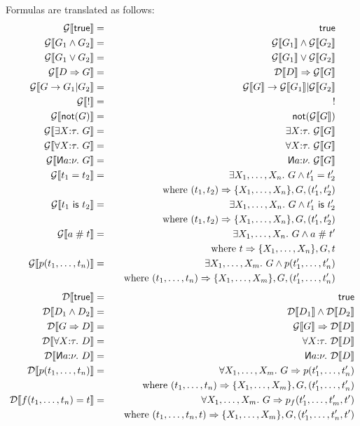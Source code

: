 \documentclass[draft,12pt]{report}
\newcommand{\fresh}{\mathrel\#}
\newcommand{\new}{\reflectbox{\sf N}}
\newcommand{\andd}{\wedge}
\newcommand{\orr}{\vee}
\newcommand{\impp}{\Rightarrow}
\begin{document}
Formulas are translated as follows:
\begin{eqnarray*}
  \gflat{\mathsf{true}} &=& \mathsf{true}\\
  \gflat{G_1 \andd G_2} &=& \gflat{G_1} \andd \gflat{G_2}\\
  \gflat{G_1 \orr G_2} &=& \gflat{G_1} \orr \gflat{G_2}\\
  \gflat{D \impp G} &=& \dflat{D} \impp \gflat{G}\\
\gflat{G \to G_1 | G_2} &=& \gflat{G} \to \gflat{G_1} | \gflat{G_2}\\
\gflat{!} &=& !\\
\gflat{\mathsf{not}(G)} &=& \mathsf{not}(\gflat{G})\\
  \gflat{\exists X{:}\tau.~G} &=& \exists X{:}\tau.~\gflat{G}\\
  \gflat{\forall X{:}\tau.~G} &=& \forall X{:}\tau.~\gflat{G}\\
  \gflat{\new a{:}\nu.~G} &=& \new a{:}\nu.~\gflat{G}\\
  \gflat{t_1 = t_2} &=& \exists X_1,\ldots,X_n.~G \andd t_1' = t_2'\\
&&  \quad \text{where }\tflat{(t_1,t_2)}{\{X_1,\ldots,X_n\}}{G}{(t_1',t_2')}\\
  \gflat{t_1 ~\mathsf{is}~ t_2} &=& \exists X_1,\ldots,X_n.~G \andd t_1' ~\mathsf{is}~ t_2'\\
&&  \quad \text{where }\tflat{(t_1,t_2)}{\{X_1,\ldots,X_n\}}{G}{(t_1',t_2')}\\
  \gflat{a \fresh t} &=& \exists X_1,\ldots,X_n.~G \andd a \fresh t'\\
&&  \quad \text{where }\tflat{t}{\{X_1,\ldots,X_n\}}{G}{t}\\
\gflat{p(t_1,\ldots,t_n)} &=& \exists{X_1,\ldots,X_m}.~G \andd
p(t_1',\ldots,t_n') \\
&&\quad\text{where }
\tflat{(t_1,\ldots,t_n)}{\{X_1,\ldots,X_m\}}{G}{(t_1',\ldots,t_n')}
\end{eqnarray*}
\begin{eqnarray*}
\dflat{\mathsf{true}} &=& \mathsf{true}\\
\dflat{D_1\andd D_2} &=& \dflat{D_1}\andd\dflat{D_2}\\
\dflat{G\impp D} &=& \gflat{G} \impp \dflat{D}\\
\dflat{\forall X{:}\tau.~D} &=& \forall X{:}\tau.~\dflat{D}\\
\dflat{\new a{:}\nu.~D} &=& \new a{:}\nu.~\dflat{D}\\
\dflat{p(t_1,\ldots,t_n)} &=& \forall{X_1,\ldots,X_m}.~G \impp
p(t_1',\ldots,t_n') \\
&&\quad\text{where }
\tflat{(t_1,\ldots,t_n)}{\{X_1,\ldots,X_m\}}{G}{(t_1',\ldots,t_n')}\\
\dflat{f(t_1,\ldots,t_n) = t} &=& \forall {X_1,\ldots,X_m}.~G \impp
p_f(t_1',\ldots,t_m',t')\\
&&\quad\text{where }
\tflat{(t_1,\ldots,t_n,t)}{\{X_1,\ldots,X_m\}}{G}{(t_1',\ldots,t_n',t')}
\end{eqnarray*}
\end{document}
